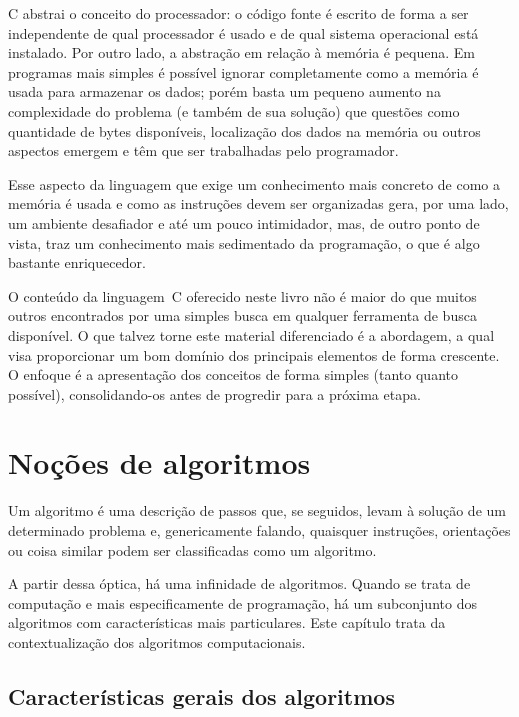 \documentclass[
  11pt,
  a4paper,
]{scrbook}
\renewcommand*\contentsname{Índice}
\newcommand\contentsname{Índice}
\begin{document}
C abstrai o conceito do processador: o código fonte é escrito de forma a
ser independente de qual processador é usado e de qual sistema
operacional está instalado. Por outro lado, a abstração em relação à
memória é pequena. Em programas mais simples é possível ignorar
completamente como a memória é usada para armazenar os dados; porém
basta um pequeno aumento na complexidade do problema (e também de sua
solução) que questões como quantidade de bytes disponíveis, localização
dos dados na memória ou outros aspectos emergem e têm que ser
trabalhadas pelo programador.

Esse aspecto da linguagem que exige um conhecimento mais concreto de
como a memória é usada e como as instruções devem ser organizadas gera,
por uma lado, um ambiente desafiador e até um pouco intimidador, mas, de
outro ponto de vista, traz um conhecimento mais sedimentado da
programação, o que é algo bastante enriquecedor.

O conteúdo da linguagem~C oferecido neste livro não é maior do que
muitos outros encontrados por uma simples busca em qualquer ferramenta
de busca disponível. O que talvez torne este material diferenciado é a
abordagem, a qual visa proporcionar um bom domínio dos principais
elementos de forma crescente. O enfoque é a apresentação dos conceitos
de forma simples (tanto quanto possível), consolidando-os antes de
progredir para a próxima etapa.

\renewcommand*\contentsname{Conteúdo}
\setcounter{tocdepth}{0}
\tableofcontents
\mainmatterreal


\chapter{Noções de algoritmos}\label{sec-nocoes-de-algoritmos}

Um algoritmo é uma descrição de passos que, se seguidos, levam à solução
de um determinado problema e, genericamente falando, quaisquer
instruções, orientações ou coisa similar podem ser classificadas como um
algoritmo.

A partir dessa óptica, há uma infinidade de algoritmos. Quando se trata
de computação e mais especificamente de programação, há um subconjunto
dos algoritmos com características mais particulares. Este capítulo
trata da contextualização dos algoritmos computacionais.

\section{Características gerais dos
algoritmos}\label{caracteruxedsticas-gerais-dos-algoritmos}
\end{document}
